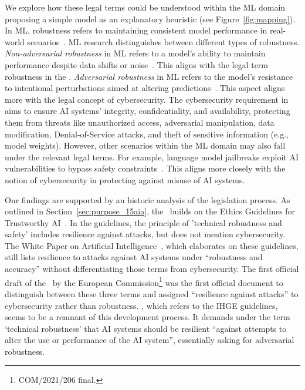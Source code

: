 We explore how these legal terms could be understood within the ML domain proposing a simple model as an explanatory heuristic (see Figure~\ref{fig:mapping}).
% 
In ML, robustness refers to maintaining consistent model performance in real-world scenarios~\cite{schwinn2022improving}. 
%
ML research distinguishes between different types of robustness. \emph{Non-adversarial robustness} in ML refers to a model’s ability to maintain performance despite data shifts or noise~\cite{tocchetti2022ai, gojic2023non, saez2016evaluating, olmin2022robustness}. This aligns with the legal term robustness in the \EUAIAct. 
%
\emph{Adversarial robustness} in ML refers to the model’s resistance to intentional perturbations aimed at altering predictions~\cite{szegedy2013intriguing}. This aspect aligns more with the legal concept of cybersecurity.
%
The cybersecurity requirement in  aims to ensure AI systems' integrity, confidentiality, and availability, protecting them from threats like unauthorized access, adversarial manipulation, data modification, Denial-of-Service attacks, and theft of sensitive information (e.g., model weights).
% 
However, other scenarios within the ML domain may also fall under the relevant legal terms. For example, language model jailbreaks exploit AI vulnerabilities to bypass safety constraints~\cite{wei2024jailbroken, vassilev2024adversarial}. This aligns more closely with the notion of cybersecurity in protecting against misuse of AI systems.


Our findings are supported by an historic analysis of the legislation process.
%  
As outlined in Section~\ref{sec:purpose_15aia}, the \EUAIAct\ builds on the Ethics Guidelines for Trustworthy AI~\cite{aiiheg2019guidelines}.
%
In the guidelines, the principle of 'technical robustness and safety' includes resilience against attacks, but does not mention cybersecurity.   
%
The White Paper on Artificial Intelligence~\cite{whitepaper}, which elaborates on these guidelines, still lists resilience to attacks against AI systems under ``robustness and accuracy'' without differentiating those terms from cybersecurity.
%
The first official draft of the \EUAIAct\ by the European Commission\footnote{COM/2021/206 final.} was the first official document to distinguish between these three terms and assigned ``resilience against attacks'' to cybersecurity rather than robustness.
%
, which refers to the IHGE guidelines, seems to be a remnant of this development process.
%
It demands under the term `technical robustness' that AI systems should be resilient ``against attempts to alter the use or performance of the AI system'', essentially asking for adversarial robustness.


